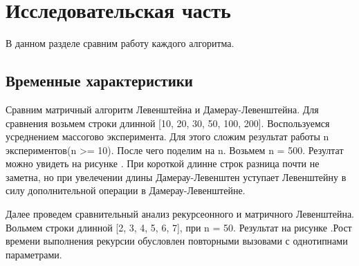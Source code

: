 \documentclass[12pt,a4paper]{report}
\begin{document}
\newpage
\chapter{Исследовательская часть}

В данном разделе сравним работу каждого алгоритма.

\section{Временные характеристики}

Сравним матричный алгоритм Левенштейна и Дамерау-Левенштейна. Для сравнения возьмем 
строки длинной [10, 20, 30, 50, 100, 200]. Воспользуемся усреднением массогово эксперимента.
Для этого сложим результат работы n экспериментов(n >= 10). После чего поделим на n.
Возьмем n = 500. Резултат можно увидеть на рисунке  . При короткой длинне строк разница почти
не заметна, но при увелечении длины Дамерау-Левенштен уступает Левенштейну в силу дополнительной операции в Дамерау-Левенштейне.

\begin{figure}[ht!]
\end{figure}

Далее проведем сравнительный анализ рекурсеонного и матричного Левенштейна. Вольмем строки длинной [2, 3, 4, 5, 6, 7], при n = 50. Результат на рисунке  .Рост времени выполнения рекурсии обусловлен повторными вызовами с однотипнами параметрами. 
\end{document}
